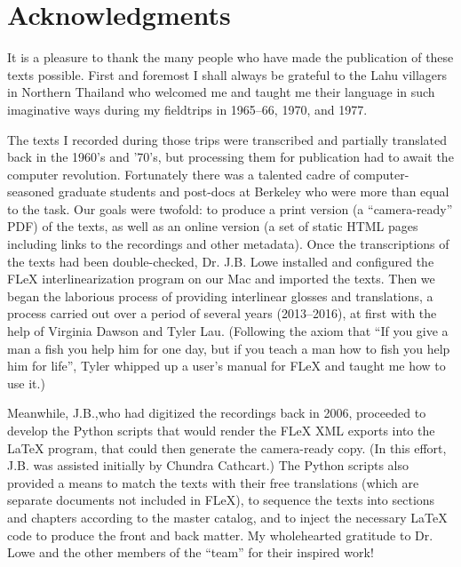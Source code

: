 \vspace{0.25em}

\renewcommand{\thefootnote}{\arabic{footnote}}
\setcounter{footnote}{0}

\section*{Acknowledgments}
It is a pleasure to thank the many people who have made the publication
of these texts possible. First and foremost I shall always be grateful
to the Lahu villagers in Northern Thailand who welcomed me and taught me
their language in such imaginative ways during my fieldtrips in 1965--66,
1970, and 1977.

The texts I recorded during those trips were transcribed and partially
translated back in the 1960's and '70's, but processing them for
publication had to await the computer revolution. Fortunately there
was a talented cadre of computer-seasoned graduate students and
post-docs at Berkeley who were more than equal to the task. Our goals
were twofold: to produce a print version (a ``camera-ready'' PDF) of
the texts, as well as an online version (a set of static HTML pages
including links to the recordings and other metadata). Once the
transcriptions of the texts had been double-checked, Dr. J.B. Lowe
installed and configured the FLeX interlinearization program on our Mac
and imported the texts. Then we began the laborious process of providing
interlinear glosses and translations, a process
carried out over a period of several years (2013--2016), at first with
the help of Virginia Dawson and Tyler Lau.  (Following the axiom that
``If you give a man a fish you help him for one day, but if you teach
a man how to fish you help him for life'', Tyler whipped up a user's
manual for FLeX and taught me how to use it.)

Meanwhile, J.B.,who had digitized the recordings back in 2006,
proceeded to develop the Python scripts that would render the FLeX XML
exports into the LaTeX program, that could then generate the
camera-ready copy. (In this effort, J.B. was assisted initially by Chundra
Cathcart.) The Python scripts also provided a means to match the texts
with their free translations (which are separate documents not included
in FLeX), to sequence the texts into sections and chapters according to
the master catalog, and to inject the necessary LaTeX code to produce
the front and back matter. My wholehearted gratitude to Dr. Lowe and the
other members of the ``team'' for their inspired work!

